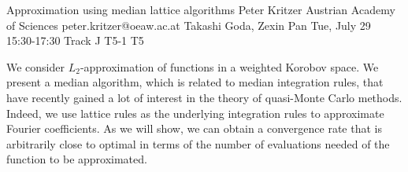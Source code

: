 \begin{talk}
  {Approximation using median lattice algorithms}%
  {Peter Kritzer}%
  {Austrian Academy of Sciences}%
  {peter.kritzer@oeaw.ac.at}%
  {Takashi Goda, Zexin Pan}%
  {}%
  {Tue, July 29 15:30-17:30 Track J}%
  {T5-1}%
  {T5}%
  
				
			
We consider $L_2$-approximation of functions in a weighted Korobov space. We present a median algorithm, which is related to median integration rules, that have recently gained a lot of interest in the theory of quasi-Monte Carlo methods. Indeed, we use lattice rules as the underlying integration rules to approximate Fourier coefficients. As we will show, we can obtain a convergence rate that is arbitrarily close to optimal in terms of the number of evaluations needed of the function to be approximated.
\end{talk}

